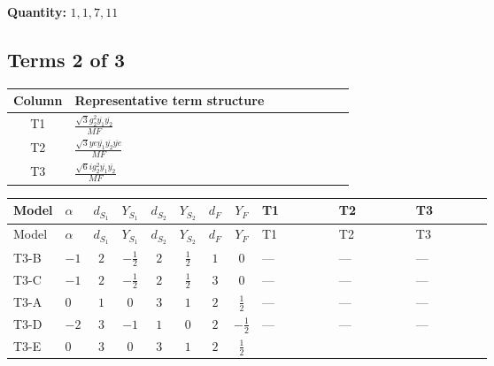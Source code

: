 \documentclass[8pt]{article}
\begin{document}
\begin{landscape}
\begin{longtable}{@{}llcccccc >{\raggedright\arraybackslash}p{0.21\linewidth} >{\raggedright\arraybackslash}p{0.21\linewidth} >{\raggedright\arraybackslash}p{0.21\linewidth}@{}}
\midrule
\bottomrule
\end{longtable}
\clearpage
\noindent\textbf{Quantity: }$\mathrm{1,1,7,11}$\par\smallskip
\subsection*{Terms 2 of 3}
\begin{center}
\begin{tabular}{@{}c >{\raggedright\arraybackslash}p{0.82\linewidth}@{}}
\toprule
Column & Representative term structure \\
\midrule
T1 & \(\displaystyle \frac{\sqrt{3} g_{2}^{2} \overline{y_{1}} \overline{y_{2}}}{MF}\) \\
\midrule
T2 & \(\displaystyle \frac{\sqrt{3} ye \overline{y_{1}} \overline{y_{2}} \overline{ye}}{MF}\) \\
\midrule
T3 & \(\displaystyle \frac{\sqrt{6} i g_{2}^{2} \overline{y_{1}} \overline{y_{2}}}{MF}\) \\
\midrule
\bottomrule
\end{tabular}
\end{center}
\smallskip
\tiny
\begin{longtable}{@{}llcccccc >{\raggedright\arraybackslash}p{0.21\linewidth} >{\raggedright\arraybackslash}p{0.21\linewidth} >{\raggedright\arraybackslash}p{0.21\linewidth}@{}}
\toprule
Model & $\alpha$ & $d_{S_1}$ & $Y_{S_1}$ & $d_{S_2}$ & $Y_{S_2}$ & $d_F$ & $Y_F$ & T1 & T2 & T3 \\
\midrule
\endfirsthead
\toprule
Model & $\alpha$ & $d_{S_1}$ & $Y_{S_1}$ & $d_{S_2}$ & $Y_{S_2}$ & $d_F$ & $Y_F$ & T1 & T2 & T3 \\
\midrule
\endhead
T3-B & $-1$ & $2$ & $-\frac{1}{2}$ & $2$ & $\frac{1}{2}$ & $1$ & $0$ & --- & --- & --- \\
\midrule
T3-C & $-1$ & $2$ & $-\frac{1}{2}$ & $2$ & $\frac{1}{2}$ & $3$ & $0$ & --- & --- & --- \\
\midrule
T3-A & $0$ & $1$ & $0$ & $3$ & $1$ & $2$ & $\frac{1}{2}$ & --- & --- & --- \\
\midrule
T3-D & $-2$ & $3$ & $-1$ & $1$ & $0$ & $2$ & $-\frac{1}{2}$ & --- & --- & --- \\
\midrule
T3-E & $0$ & $3$ & $0$ & $3$ & $1$ & $2$ & $\frac{1}{2}$ & \scriptsize\adjustbox{max width=\linewidth}{$\begin{gathered} \frac{49 \sqrt{3} g_{2}^{2} \overline{y_{1}} \overline{y_{2}}}{24 MF}\end{gathered}$} & \scriptsize\adjustbox{max width=\linewidth}{$\begin{gathered} - \frac{\sqrt{3} ye \overline{y_{1}} \overline{y_{2}} \overline{ye}}{12 MF}\end{gathered}$} & \scriptsize\adjustbox{max width=\linewidth}{$\begin{gathered} \frac{\sqrt{6} i g_{2}^{2} \overline{y_{1}} \overline{y_{2}}}{3 MF}\end{gathered}$} \\

\end{longtable}
\end{landscape}
\end{document}
